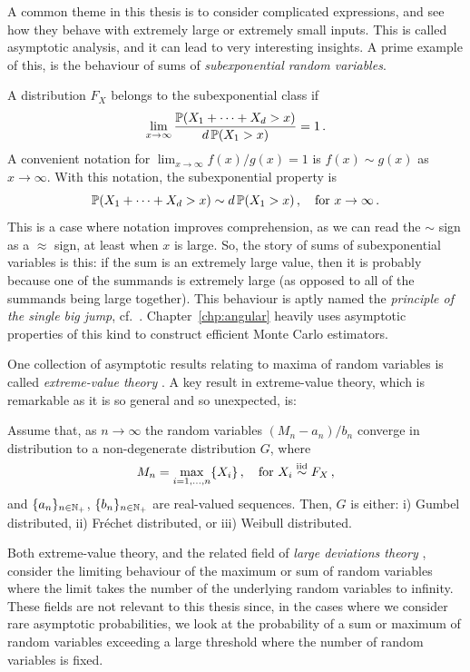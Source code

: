 A common theme in this thesis is to consider complicated expressions, and see how they behave with extremely large or extremely small inputs. This is called asymptotic analysis, and it can lead to very interesting insights. A prime example of this, is the behaviour of sums of \emph{subexponential random variables}.

A distribution $F_X$ belongs to the subexponential class if
\[ \lim_{x \to \infty} \frac{ \operatorname{{\mathbb P}}(X_1 + \dots + X_d > x) }{ d \operatorname{{\mathbb P}}(X_1 > x) } = 1 \,. \]
A convenient notation for $\lim_{x \to \infty} f(x)/g(x) = 1$ is $f(x) \sim g(x)$ as $x \to \infty$. With this notation, the subexponential property is
\[ \operatorname{{\mathbb P}}(X_1 + \dots + X_d > x) \sim d \operatorname{{\mathbb P}}(X_1 > x) \,, \quad \text{for } x \to \infty\,. \]
This is a case where notation improves comprehension, as we can read the $\sim$ sign as a $\approx$ sign, at least when $x$ is large. So, the story of sums of subexponential variables is this: if the sum is an extremely large value, then it is probably because one of the summands is extremely large (as opposed to all of the summands being large together). This behaviour is aptly named the \emph{principle of the single big jump}, cf.\ \cite{foss2011introduction}. Chapter~\ref{chp:angular} heavily uses asymptotic properties of this kind to construct efficient Monte Carlo estimators.

One collection of asymptotic results relating to maxima of random variables is called \emph{extreme-value theory} \cite{de2007extreme}. A key result in extreme-value theory, which is remarkable as it is so general and so unexpected, is:

\begin{theorem}

Assume that, as $n\to\infty$ the random variables $(M_n - a_n) / b_n$ converge in distribution to a non-degenerate distribution $G$, where
\[ M_n = \max_{i=1,\dots,n} \{X_i\} \,, \quad \text{for } X_i \overset{\smash{\mathrm{iid}}}{\sim} F_X \,, \]
and $\{ a_n \}_{n\in\mathbb{N}_+}$, $\{ b_n \}_{n\in\mathbb{N}_+}$ are real-valued sequences. Then, $G$ is either: i) Gumbel distributed, ii) Fr{\'e}chet distributed, or iii) Weibull distributed.

\end{theorem}

Both extreme-value theory, and the related field of \emph{large deviations theory} \cite{deuschel2001large}, consider the limiting behaviour of the maximum or sum of random variables where the limit takes the number of the underlying random variables to infinity. These fields are not relevant to this thesis since, in the cases where we consider rare asymptotic probabilities, we look at the probability of a sum or maximum of random variables exceeding a large threshold where the number of random variables is fixed.

